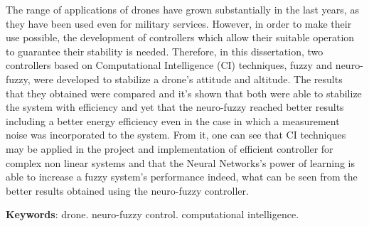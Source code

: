 %
%

\begin{resumo}[Abstract]

The range of applications of drones have grown substantially in the last years, as they have been used even for military services. However, in order to make their use possible, the development of controllers which allow their suitable operation to guarantee their stability is needed. Therefore, in this dissertation, two controllers based on Computational Intelligence (CI) techniques, fuzzy and neuro-fuzzy, were developed to stabilize a drone's attitude and altitude. The results that they obtained were compared and it's shown that both were able to stabilize the system with efficiency and yet that the neuro-fuzzy reached better results including a better energy efficiency even in the case in which a measurement noise was incorporated to the system. From it, one can see that CI techniques may be applied in the project and implementation of efficient controller for complex non linear systems and that the Neural Networks's power of learning is able to increase a fuzzy system's performance indeed, what can be seen from the better results obtained using the neuro-fuzzy controller.

\textbf{Keywords}: drone. neuro-fuzzy control. computational intelligence.

\end{resumo}




